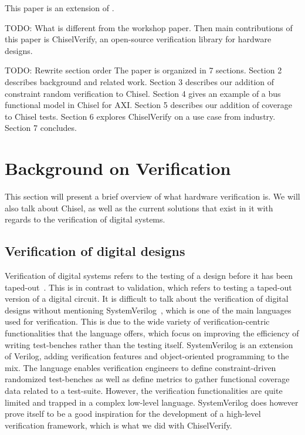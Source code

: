 \documentclass[conference]{IEEEtran}
\newcommand{\todo}[1]{{\color{olive} TODO: #1}}
\begin{document}
This paper is an extension of \cite{verify:chisel:2020}.

\todo{What is different from the workshop paper}. Then main contributions of
this paper is ChiselVerify, an open-source verification library for hardware designs.

\todo{Rewrite section order}
The paper is organized in 7 sections.
Section 2 describes background and related work.
Section 3 describes our addition of constraint random verification to Chisel.
Section 4 gives an example of a bus functional model in Chisel for AXI.
Section 5 describes our addition of coverage to Chisel tests.
Section 6 explores ChiselVerify on a use case from industry.
Section 7 concludes.


\section{Background on Verification}
\label{sec:background}

This section will present a brief overview of what hardware verification is. We will also talk about Chisel, as well as the current solutions that exist in it with regards to the verification of digital systems.

\subsection{Verification of digital designs}
Verification of digital systems refers to the testing of a design before it has been taped-out~\cite{spear2008systemverilog}. This is in contrast to validation, which refers to testing a taped-out version of a digital circuit. 
It is difficult to talk about the verification of digital designs without mentioning SystemVerilog~\cite{SystemVerilog}, which is one of the main languages used for verification.
This is due to the wide variety of verification-centric functionalities that the language offers, which focus on improving the efficiency of writing test-benches rather than the testing itself.
SystemVerilog is an extension of Verilog, adding verification features and object-oriented programming to the mix. 
The language enables verification engineers to define constraint-driven randomized test-benches as well as define metrics to gather functional coverage data related to a test-suite. 
However, the verification functionalities are quite limited and trapped in a complex low-level language. 
SystemVerilog does however prove itself to be a good inspiration for the development of a high-level verification framework, which is what we did with ChiselVerify.
\end{document}
